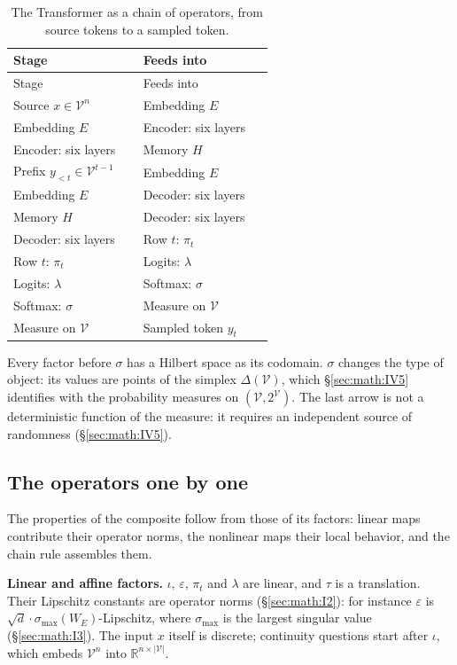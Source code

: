 \begin{longtable}{@{}>{\raggedright\arraybackslash}p{0.44\linewidth}>{\raggedright\arraybackslash}p{0.44\linewidth}@{}}
\caption{The Transformer as a chain of operators, from source tokens to a sampled token.}\\
\toprule
Stage & Feeds into \\
\midrule
\endfirsthead
\toprule
Stage & Feeds into \\
\midrule
\endhead
\bottomrule
\endlastfoot
Source \(x \in \mathcal{V}^{n}\) & Embedding \(E\) \\
Embedding \(E\) & Encoder: six layers \\
Encoder: six layers & Memory \(H\) \\
Prefix \(y_{<t} \in \mathcal{V}^{t-1}\) & Embedding \(E\) \\
Embedding \(E\) & Decoder: six layers \\
Memory \(H\) & Decoder: six layers \\
Decoder: six layers & Row \(t\): \(\pi_t\) \\
Row \(t\): \(\pi_t\) & Logits: \(\lambda\) \\
Logits: \(\lambda\) & Softmax: \(\sigma\) \\
Softmax: \(\sigma\) & Measure on \(\mathcal{V}\) \\
Measure on \(\mathcal{V}\) & Sampled token \(y_t\) \\
\end{longtable}

Every factor before \(\sigma\) has a Hilbert space as its codomain. \(\sigma\) changes the
type of object: its values are points of the simplex \(\Delta(\mathcal{V})\),
which \S\ref{sec:math:IV5} identifies with the probability measures on
\((\mathcal{V}, 2^{\mathcal{V}})\). The last arrow is not a
deterministic function of the measure: it requires an independent source
of randomness (\S\ref{sec:math:IV5}).

\subsection{The operators one by
one}\label{sec:math:IV2}

The properties of the composite follow from those of its factors: linear
maps contribute their operator norms, the nonlinear maps their local
behavior, and the chain rule assembles them.

\textbf{Linear and affine factors.} \(\iota\), \(\varepsilon\), \(\pi_t\) and \(\lambda\) are linear, and \(\tau\)
is a translation. Their Lipschitz constants are operator norms (\S\ref{sec:math:I2}):
for instance \(\varepsilon\) is \(\sqrt{d}\cdot\sigma_{\max}(W_E)\)-Lipschitz, where \(\sigma_{\max}\) is the
largest singular value (\S\ref{sec:math:I3}). The input \(x\) itself is discrete;
continuity questions start after \(\iota\), which embeds \(\mathcal{V}^{n}\)
into \(\mathbb{R}^{n\times |\mathcal{V}|}\).

